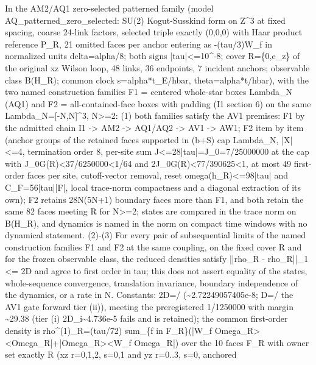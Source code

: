 \begin{gatequote}
In the AM2/AQ1 zero-selected patterned family (model
AQ\_patterned\_zero\_selected: SU(2) Kogut-Susskind form on
Z\textasciicircum{}3 at fixed spacing, coarse 24-link factors, selected triple
exactly (0,0,0) with Haar product reference P\_R, 21 omitted faces per anchor
entering as -(tau/3)W\_f in normalized units delta=alpha/8; both signs
|tau|<=10\textasciicircum{}-8; cover R=\{0,e\_z\} of the original xz Wilson
loop, 48 links, 36 endpoints, 7 incident anchors; observable class B(H\_R);
common clock s=alpha*t\_E/hbar, theta=alpha*t/hbar), with the two named
construction families F1 = centered whole-star boxes Lambda\_N (AQ1) and F2 =
all-contained-face boxes with padding (I1 section 6) on the same
Lambda\_N=[-N,N]\textasciicircum{}3, N>=2: (1) both families satisfy the AV1
premises: F1 by the admitted chain I1 -> AM2 -> AQ1/AQ2 -> AV1 -> AW1; F2 item
by item (anchor groups of the retained faces supported in (b+S) cap Lambda\_N,
|X|<=4, termination order 8, per-site sum J<=28|tau|=J\_0=7/25000000 at the
cap with J\_0G(R)<37/6250000<1/64 and 2J\_0G\textquotesingle{}(R)<77/390625<1,
at most 49 first-order faces per site, cutoff-vector removal, reset
omega(h\_R)<=98|tau| and C\_F=56|tau||F|, local trace-norm compactness and a
diagonal extraction of its own); F2 retains 28N(5N+1) boundary faces more than
F1, and both retain the same 82 faces meeting R for N>=2; states are compared
in the trace norm on B(H\_R), and dynamics is named in the norm on compact
time windows with no dynamical statement. (2)-(3) For every pair of
subsequential limits of the named construction families F1 and F2 at the same
coupling, on the fixed cover R and for the frozen observable class, the
reduced densities satisfy ||rho\_R - rho\textquotesingle{}\_R||\_1 <= 2D and
agree to first order in tau; this does not assert equality of the states,
whole-sequence convergence, translation invariance, boundary independence of
the dynamics, or a rate in N. Constants: 2D=/ (\textasciitilde{}2.72249057405e-8;
D=/ the AV1 gate forward tier (ii)),
meeting the preregistered 1/1250000 with margin \textasciitilde{}29.38 (tier
(i) 2D\_i\textasciitilde{}4.736e-5 fails and is retained); the common
first-order density is rho\textasciicircum{}(1)\_R=(tau/72) sum\_\{f in
F\_R\}(|W\_f Omega\_R><Omega\_R|+|Omega\_R><W\_f Omega\_R|) over the 10 faces
F\_R with owner set exactly R (xz r=0,1,2, s=0,1 and yz r=0..3, s=0, anchored

\end{gatequote}
